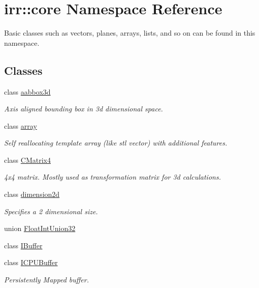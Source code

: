 \hypertarget{namespaceirr_1_1core}{}\section{irr\+:\+:core Namespace Reference}
\label{namespaceirr_1_1core}


Basic classes such as vectors, planes, arrays, lists, and so on can be found in this namespace.  


\subsection*{Classes}
\begin{DoxyCompactItemize}
\item 
class \hyperlink{classirr_1_1core_1_1aabbox3d}{aabbox3d}
\begin{DoxyCompactList}\small\item\em Axis aligned bounding box in 3d dimensional space. \end{DoxyCompactList}\item 
class \hyperlink{classirr_1_1core_1_1array}{array}
\begin{DoxyCompactList}\small\item\em Self reallocating template array (like stl vector) with additional features. \end{DoxyCompactList}\item 
class \hyperlink{classirr_1_1core_1_1CMatrix4}{C\+Matrix4}
\begin{DoxyCompactList}\small\item\em 4x4 matrix. Mostly used as transformation matrix for 3d calculations. \end{DoxyCompactList}\item 
class \hyperlink{classirr_1_1core_1_1dimension2d}{dimension2d}
\begin{DoxyCompactList}\small\item\em Specifies a 2 dimensional size. \end{DoxyCompactList}\item 
union \hyperlink{unionirr_1_1core_1_1FloatIntUnion32}{Float\+Int\+Union32}
\item 
class \hyperlink{classirr_1_1core_1_1IBuffer}{I\+Buffer}
\item 
class \hyperlink{classirr_1_1core_1_1ICPUBuffer}{I\+C\+P\+U\+Buffer}
\begin{DoxyCompactList}\small\item\em Persistently Mapped buffer. \end{DoxyCompactList}\item 

\end{DoxyCompactItemize}
